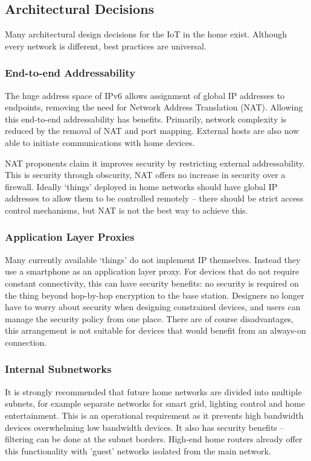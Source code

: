 \documentclass[10pt,journal,compsoc]{IEEEtran}
\begin{document}
\subsection{Architectural Decisions}
Many architectural design decisions for the IoT in the home exist. Although
every network is different, best practices are universal. 

\subsubsection{End-to-end Addressability}
The huge address space of IPv6 allows assignment of global IP addresses to
endpoints, removing the need for Network Address Translation (NAT). Allowing
this end-to-end addressability has benefits. Primarily, network complexity is
reduced by the removal of NAT and port mapping. External hosts are also now
able to initiate communications with home devices.

NAT proponents claim it improves security by restricting external
addressability. This is security through obscurity, NAT offers no increase in
security over a firewall. Ideally `things' deployed in home networks should
have global IP addresses to allow them to be controlled remotely -- there
should be strict access control mechanisms, but NAT is not the best way to
achieve this. 

\subsubsection{Application Layer Proxies}
Many currently available `things' do not implement IP themselves. Instead they
use a smartphone as an application layer proxy. For devices that do not require
constant connectivity, this can have security benefits: no security is required
on the thing beyond hop-by-hop encryption to the base station.  Designers no
longer have to worry about security when designing constrained devices, and
users can manage the security policy from one place. There are of course
disadvantages, this arrangement is not suitable for devices that would benefit
from an always-on connection. 

\subsubsection{Internal Subnetworks}
It is strongly recommended that future home networks are divided into multiple
subnets, for example separate networks for smart grid, lighting control and
home entertainment. This is an operational requirement as it prevents high
bandwidth devices overwhelming low bandwidth devices. It also has security
benefits -- filtering can be done at the subnet borders. High-end home routers
already offer this functionality with 'guest' networks isolated from the main
network.
\end{document}
